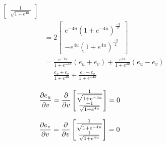 \documentclass[a4paper, 11pt]{article}
\begin{document}
\begin{enumerate}[label=(\alph*)]
\begin{mdframed}
\begin{minipage}[t]{0.5\textwidth}
\begin{align*}
\begin{bmatrix}
                                    \frac{1}{\sqrt{1 + e^{4u}}}
                                  \end{bmatrix}               \\
                        & =  2\begin{bmatrix}
                                e^{-4u}\left( 1+e^{-4u} \right)^{\frac{-3}2} \\
                                -e^{4u}\left( 1+e^{4u} \right)^{\frac{-3}2}
                              \end{bmatrix}       \\
                        & =
              \frac{e^{-4u}}{1+e^{-4u}}(e_u+e_v)
              +\frac{e^{4u}}{1+e^{4u}}(e_u-e_v)                                  \\
                        & = \frac{e_u+e_v}{1+e^{4u}} + \frac{e_u-e_v}{1+e^{-4u}}
            \end{align*}
          \end{minipage}

          \begin{minipage}[t]{0.5\textwidth}
            \begin{align*}
              \dfrac{\partial e_u}{\partial v} & = \dfrac{\partial}{\partial v}\begin{bmatrix}
                                    \frac{1}{\sqrt{1 + e^{-4u}}} \\
                                    \frac{-1}{\sqrt{1 + e^{4u}}}
                                  \end{bmatrix}
              = 0
            \end{align*}
          \end{minipage}\begin{minipage}[t]{0.5\textwidth}
            \begin{align*}
              \dfrac{\partial e_v}{\partial v} & = \dfrac{\partial}{\partial v}\begin{bmatrix}
                                    \frac{1}{\sqrt{1 + e^{-4u}}} \\
                                    \frac{1}{\sqrt{1 + e^{4u}}}
                                  \end{bmatrix}
              = 0\end{align*}
          \end{minipage}
        \end{mdframed}



\end{enumerate}
\end{document}
